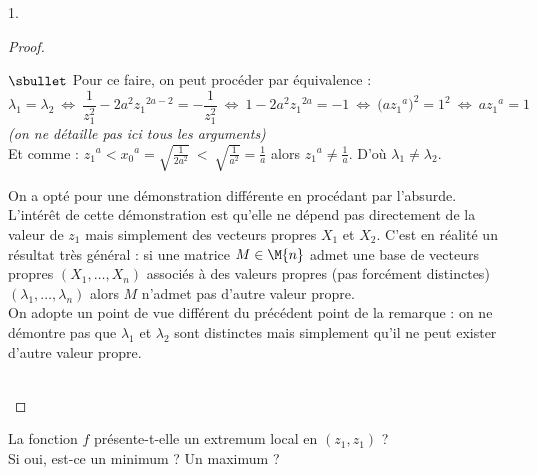 \documentclass[11pt]{article}%
\begin{document}
\begin{noliste}{1.}
\begin{proof}
\begin{remarkL}{.97}
\begin{noliste}{$\sbullet$}
      Pour ce faire, on peut procéder par équivalence :
      \[
      \lambda_1 = \lambda_2 \ \Leftrightarrow \
      \dfrac{1}{z_1^2}-2a^2z_1{}^{2a-2} = -\dfrac{1}{z_1^2} \
      \Leftrightarrow \ 1-2a^2z_1{}^{2a} = -1
      \ \Leftrightarrow \ \big( a z_1{}^a \big)^2 = 1^2 \
      \Leftrightarrow \ a z_1{}^a = 1 
      \]
      {\it (on ne détaille pas ici tous les arguments)}\\
      Et comme : $z_1{}^a < x_0{}^a = \sqrt{\frac{1}{2a^2}} \ < \
      \sqrt{\frac{1}{a^2}} = \frac{1}{a}$ alors $z_1{}^a \neq
      \frac{1}{a}$. D'où $\lambda_1 \neq \lambda_2$.

    \item On a opté pour une démonstration différente en procédant par
      l'absurde. L'intérêt de cette démonstration est qu'elle ne
      dépend pas directement de la valeur de $z_1$ mais simplement des
      vecteurs propres $X_1$ et $X_2$. C'est en réalité un résultat
      très général : si une matrice $M \in \M{n}$ admet une base de
      vecteurs propres $(X_1, \ldots, X_n)$ associés à des valeurs
      propres (pas forcément distinctes) $(\lambda_1, \ldots,
      \lambda_n)$ alors $M$ n'admet pas d'autre valeur propre.\\
      On adopte un point de vue différent du précédent point de la
      remarque : on ne démontre pas que $\lambda_1$ et $\lambda_2$
      sont distinctes mais simplement qu'il ne peut exister d'autre
      valeur propre.
    \end{noliste}
  \end{remarkL}~\\[-1.4cm]
\end{proof}


\newpage


\item La fonction $f$ présente-t-elle un extremum local en $(z_1,z_1)$
  ? \\
  Si oui, est-ce un minimum ? Un maximum ?


\end{noliste}
\end{document}
